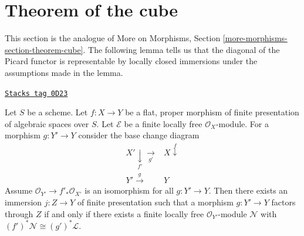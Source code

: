 \section{Theorem of the cube}
\label{spaces-more-morphisms-section-theorem-cube}
This section is the analogue of More on Morphisms, Section
\ref{more-morphisms-section-theorem-cube}.
The following lemma tells us that the diagonal of the Picard
functor is representable by locally closed immersions under
the assumptions made in the lemma.

\begin{lemma}
\label{spaces-more-morphisms-lemma-diagonal-picard-flat-proper}
\href{https://stacks.math.columbia.edu/tag/0D23}{\texttt{Stacks tag 0D23}}

Let $S$ be a scheme.
Let $f : X \to Y$ be a flat, proper morphism of finite presentation
of algebraic spaces over $S$.
Let $\mathcal{E}$ be a finite locally free $\mathcal{O}_X$-module.
For a morphism $g : Y' \to Y$ consider the base change diagram
$$
\begin{array}{cc}X' \underset{f'}{\downarrow}\underset{g'}{\longrightarrow} & X \overset{f}{\downarrow} \\ Y' \overset{g}{\longrightarrow} & Y\end{array}
$$
Assume $\mathcal{O}_{Y'} \to f'_*\mathcal{O}_{X'}$ is an
isomorphism for all $g : Y' \to Y$.
Then there exists an immersion $j : Z \to Y$ of finite presentation
such that a morphism $g : Y' \to Y$ factors through $Z$ if and only if
there exists a finite locally free $\mathcal{O}_{Y'}$-module $\mathcal{N}$
with $(f')^*\mathcal{N} \cong (g')^*\mathcal{L}$.
\end{lemma}

